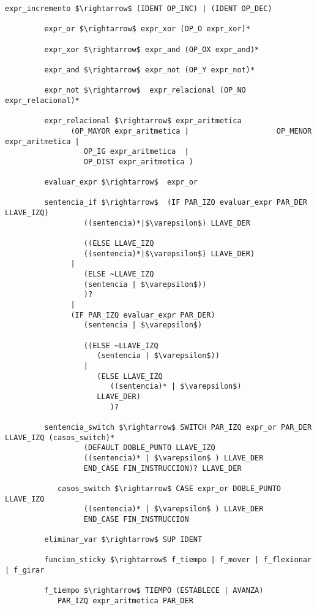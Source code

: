 \begin{lstlisting}[escapechar=\$]
         expr_incremento $\rightarrow$ (IDENT OP_INC) | (IDENT OP_DEC)
         
         expr_or $\rightarrow$ expr_xor (OP_O expr_xor)*
         
         expr_xor $\rightarrow$ expr_and (OP_OX expr_and)*
         
         expr_and $\rightarrow$ expr_not (OP_Y expr_not)*
         
         expr_not $\rightarrow$  expr_relacional (OP_NO expr_relacional)*
         
         expr_relacional $\rightarrow$ expr_aritmetica 
               (OP_MAYOR expr_aritmetica |                    OP_MENOR expr_aritmetica |
                  OP_IG expr_aritmetica  |
                  OP_DIST expr_aritmetica )
         
         evaluar_expr $\rightarrow$  expr_or
         
         sentencia_if $\rightarrow$  (IF PAR_IZQ evaluar_expr PAR_DER LLAVE_IZQ) 
                  ((sentencia)*|$\varepsilon$) LLAVE_DER 
      
                  ((ELSE LLAVE_IZQ
                  ((sentencia)*|$\varepsilon$) LLAVE_DER)
               |
                  (ELSE ~LLAVE_IZQ
                  (sentencia | $\varepsilon$))
                  )?
               |
               (IF PAR_IZQ evaluar_expr PAR_DER)
                  (sentencia | $\varepsilon$)
         
                  ((ELSE ~LLAVE_IZQ
                     (sentencia | $\varepsilon$))          
                  |
                     (ELSE LLAVE_IZQ
                        ((sentencia)* | $\varepsilon$) 
                     LLAVE_DER)
                        )?
    
         sentencia_switch $\rightarrow$ SWITCH PAR_IZQ expr_or PAR_DER                     LLAVE_IZQ (casos_switch)*
                  (DEFAULT DOBLE_PUNTO LLAVE_IZQ
                  ((sentencia)* | $\varepsilon$ ) LLAVE_DER 
                  END_CASE FIN_INSTRUCCION)? LLAVE_DER

            casos_switch $\rightarrow$ CASE expr_or DOBLE_PUNTO LLAVE_IZQ 
                  ((sentencia)* | $\varepsilon$ ) LLAVE_DER
                  END_CASE FIN_INSTRUCCION

         eliminar_var $\rightarrow$ SUP IDENT
         
         funcion_sticky $\rightarrow$ f_tiempo | f_mover | f_flexionar | f_girar
         
         f_tiempo $\rightarrow$ TIEMPO (ESTABLECE | AVANZA) 
            PAR_IZQ expr_aritmetica PAR_DER
         

\end{lstlisting}
